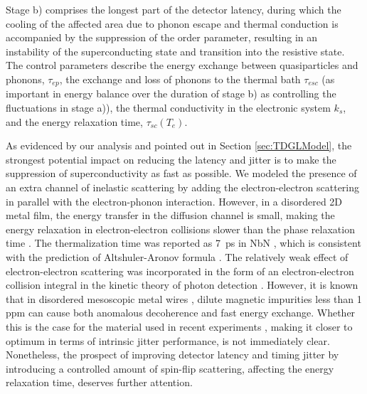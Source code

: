 \documentclass[%
reprint,
 amsmath,amssymb,
aps,
pra,
]{revtex4-1}
\begin{document}
\quad Stage b) comprises the longest part of the detector latency, during which the cooling of the affected area due to phonon escape and thermal conduction is accompanied by the suppression of the order parameter, resulting in an instability of the superconducting state and transition into the resistive state. The control parameters describe the energy exchange between quasiparticles and phonons, \(\tau_{ep}\), the exchange and loss of phonons to the thermal bath \(\tau_{esc}\) (as important in energy balance over the duration of stage b) as controlling the fluctuations in stage a)), the thermal conductivity in the electronic system \(k_s\), and the energy relaxation time, \(\tau_{sc}\left(T_e\right)\).  

\quad As evidenced by our analysis and pointed out in Section \ref{sec:TDGLModel}, the strongest potential impact on reducing the latency and jitter is to make the suppression of superconductivity as fast as possible.  We modeled the presence of an extra channel of inelastic scattering by adding the electron-electron scattering in parallel with the electron-phonon interaction.  However, in a disordered 2D metal film, the energy transfer in the diffusion channel is small, making the energy relaxation in electron-electron collisions slower than the phase relaxation time \cite{a._l._efros_electron-electron_1985}.  The thermalization time was reported as 7~ps in NbN \cite{ilin_ultimate_1998}, which is consistent with the prediction of Altshuler-Aronov formula \cite{korneeva_comparison_2017}.  The relatively weak effect of electron-electron scattering was incorporated in the form of an electron-electron collision integral in the kinetic theory of photon detection \cite{vodolazov_single-photon_2017}.  However, it is known that in disordered mesoscopic metal wires \cite{pierre_dephasing_2003}, dilute magnetic impurities less than 1 ppm can cause both anomalous decoherence and fast energy exchange.  Whether this is the case for the material used in recent experiments \cite{korzh_demonstrating_2018}, making it closer to optimum in terms of intrinsic jitter performance, is not immediately clear.  Nonetheless, the prospect of improving detector latency and timing jitter by introducing a controlled amount of spin-flip scattering, affecting the energy relaxation time, deserves further attention.
\end{document}
